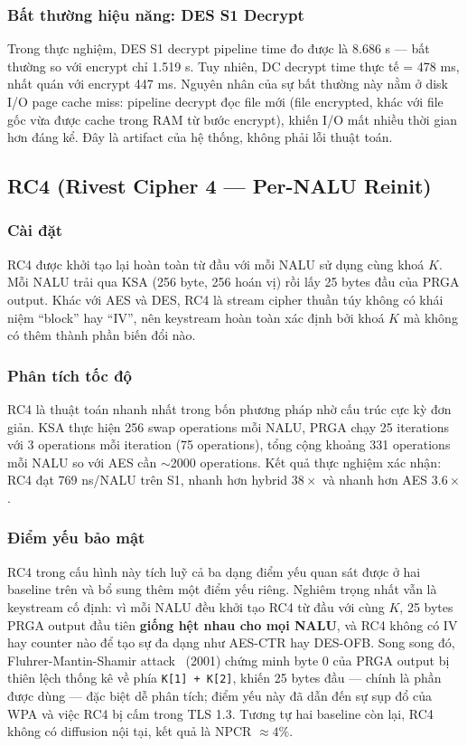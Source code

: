 \subsubsection{Bất thường hiệu năng: DES S1 Decrypt}

Trong thực nghiệm, DES S1 decrypt pipeline time đo được là 8.686 s --- bất thường so với encrypt chỉ 1.519 s. Tuy nhiên, DC decrypt time thực tế = 478 ms, nhất quán với encrypt 447 ms. Nguyên nhân của sự bất thường này nằm ở disk I/O page cache miss: pipeline decrypt đọc file mới (file encrypted, khác với file gốc vừa được cache trong RAM từ bước encrypt), khiến I/O mất nhiều thời gian hơn đáng kể. Đây là artifact của hệ thống, không phải lỗi thuật toán.

\subsection{RC4 (Rivest Cipher 4 --- Per-NALU Reinit)}

\subsubsection{Cài đặt}

RC4 được khởi tạo lại hoàn toàn từ đầu với mỗi NALU sử dụng cùng khoá $K$. Mỗi NALU trải qua KSA (256 byte, 256 hoán vị) rồi lấy 25 bytes đầu của PRGA output. Khác với AES và DES, RC4 là stream cipher thuần túy không có khái niệm ``block'' hay ``IV'', nên keystream hoàn toàn xác định bởi khoá $K$ mà không có thêm thành phần biến đổi nào.

\subsubsection{Phân tích tốc độ}

RC4 là thuật toán nhanh nhất trong bốn phương pháp nhờ cấu trúc cực kỳ đơn giản. KSA thực hiện 256 swap operations mỗi NALU, PRGA chạy 25 iterations với 3 operations mỗi iteration (75 operations), tổng cộng khoảng 331 operations mỗi NALU so với AES cần $\sim$2000 operations. Kết quả thực nghiệm xác nhận: RC4 đạt 769 ns/NALU trên S1, nhanh hơn hybrid $38\times$ và nhanh hơn AES $3.6\times$.

\subsubsection{Điểm yếu bảo mật}

RC4 trong cấu hình này tích luỹ cả ba dạng điểm yếu quan sát được ở hai baseline trên và bổ sung thêm một điểm yếu riêng. Nghiêm trọng nhất vẫn là keystream cố định: vì mỗi NALU đều khởi tạo RC4 từ đầu với cùng $K$, 25 bytes PRGA output đầu tiên \textbf{giống hệt nhau cho mọi NALU}, và RC4 không có IV hay counter nào để tạo sự đa dạng như AES-CTR hay DES-OFB. Song song đó, Fluhrer-Mantin-Shamir attack~\cite{fms_rc4} (2001) chứng minh byte 0 của PRGA output bị thiên lệch thống kê về phía \texttt{K[1] + K[2]}, khiến 25 bytes đầu --- chính là phần được dùng --- đặc biệt dễ phân tích; điểm yếu này đã dẫn đến sự sụp đổ của WPA và việc RC4 bị cấm trong TLS 1.3. Tương tự hai baseline còn lại, RC4 không có diffusion nội tại, kết quả là NPCR $\approx 4\%$.

